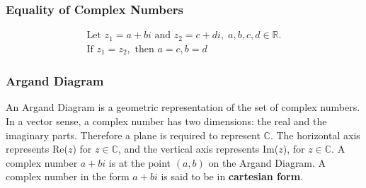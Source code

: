 \documentclass[a4paper]{article}
\begin{document}
			\subsubsection{Equality of Complex Numbers}
				\begin{equation*}
					\begin{aligned}
						\text{Let }z_1=a+bi\text{ and }z_2=c+di,\;a,b,c,d\in\mathbb{R}. \\
						\text{If }z_1=z_2,\text{ then }a=c, b=d
					\end{aligned}
				\end{equation*}
			\subsubsection{Argand Diagram}
				\begin{minipage}[t]{0.6\textwidth}
					\vspace{0pt}
				\end{minipage}\hfill
				\begin{minipage}[t]{0.4\textwidth}
					\vspace{0pt}
					\centering
					An Argand Diagram is a geometric representation of the set of complex numbers. In a vector sense, a complex number has two dimensions: the real and the imaginary parts. Therefore a plane is required to represent $\mathbb{C}$.\newline\newline
					The horizontal axis represents Re($z$) for $z\in\mathbb{C}$, and the vertical axis represents Im($z$), for $z\in\mathbb{C}$.\newline\newline
					A complex number $a+bi$ is at the point $(a,b)$ on the Argand Diagram. A complex number in the form $a+bi$ is said to be in \textbf{cartesian form}.
				\end{minipage}
\end{document}

